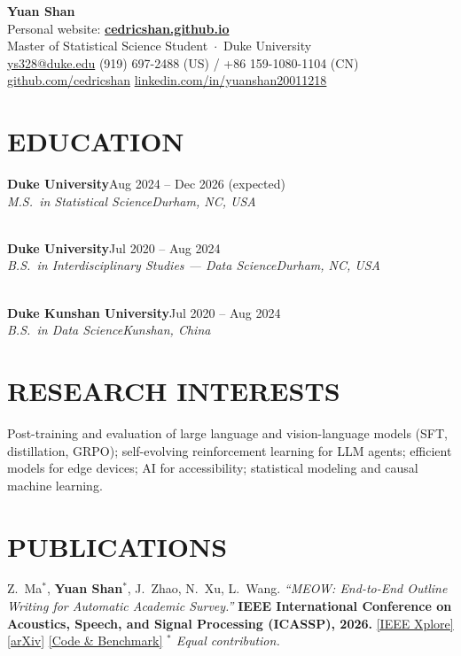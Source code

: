 \documentclass[11pt,letterpaper]{article}
\newcommand{\entry}[4]{%
  \noindent\textbf{\color{ink}#1}\hfill{\color{soft}\small #3}\\[1pt]%
  \textit{\color{muted}#2}\hfill\textit{\color{soft}\small #4}%
  \vspace{2pt}%
}
\begin{document}
\begin{center}
  {\fontsize{30}{34}\selectfont\bfseries\color{ink} Yuan Shan}\\[4pt]
  {\small\color{muted} Personal website:}\; {\fontsize{12.5}{14}\selectfont\bfseries\color{accent}\href{https://cedricshan.github.io}{cedricshan.github.io}}\\[6pt]
  {\small\color{muted} Master of Statistical Science Student\, $\cdot$\, Duke University}\\[8pt]
  {\small\color{muted}
    \href{mailto:ys328@duke.edu}{ys328@duke.edu}
    \;\textbar\; (919) 697-2488 (US) / +86 159-1080-1104 (CN) \;\textbar\;
    \href{https://github.com/cedricshan}{github.com/cedricshan}
    \;\textbar\;
    \href{https://www.linkedin.com/in/yuanshan20011218/}{linkedin.com/in/yuanshan20011218}
  }
\end{center}

\section{EDUCATION}

\entry{Duke University}{M.S.\ in Statistical Science}{Aug 2024 -- Dec 2026 (expected)}{Durham, NC, USA}
\\[3pt]
\entry{Duke University}{B.S.\ in Interdisciplinary Studies --- Data Science}{Jul 2020 -- Aug 2024}{Durham, NC, USA}
\\[3pt]
\entry{Duke Kunshan University}{B.S.\ in Data Science}{Jul 2020 -- Aug 2024}{Kunshan, China}

\section{RESEARCH INTERESTS}
\noindent\color{muted}
Post-training and evaluation of large language and vision-language models (SFT, distillation, GRPO); self-evolving reinforcement learning for LLM agents; efficient models for edge devices; AI for accessibility; statistical modeling and causal machine learning.

\section{PUBLICATIONS}

\noindent
Z.~Ma$^{*}$, \textbf{\color{ink}Yuan Shan}$^{*}$, J.~Zhao, N.~Xu, L.~Wang.
\textit{``MEOW: End-to-End Outline Writing for Automatic Academic Survey.''}
\textbf{IEEE International Conference on Acoustics, Speech, and Signal Processing (ICASSP), 2026.}
\;\href{https://ieeexplore.ieee.org/document/11462654}{[IEEE Xplore]}\;
\href{https://arxiv.org/abs/2509.19370}{[arXiv]}\;
\href{https://github.com/cedricshan/Survey-Outline-Evaluation-Benckmark}{[Code \& Benchmark]}
\hfill {\small\color{soft}\textit{$^{*}$ Equal contribution.}}
\end{document}
